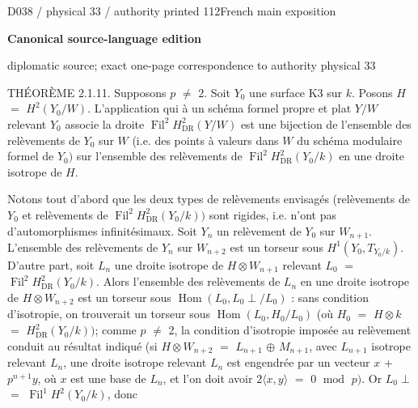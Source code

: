 \documentclass[9pt]{article}
\newcommand{\CanonText}[1]{\par{\fontsize{8.0}{9.35}\selectfont\RaggedRight #1\par}\vspace{2.2pt}}
\newcommand{\LayerTitle}{Canonical source-language edition}
\begin{document}
\noindent\begin{minipage}[t][\dimexpr\textheight-5pt\relax][t]{\textwidth}
{\sffamily\fontsize{7.3}{8.2}\selectfont\color{Quiet} D038 / physical 33 / authority printed 112\hfill French main exposition}
\par{}\vspace{4.5pt}
{\sffamily\fontsize{10.4}{11.6}\selectfont\bfseries\color{Accent} \LayerTitle}
\par{\sffamily\fontsize{6.7}{7.7}\selectfont\color{Quiet} diplomatic source; exact one-page correspondence to authority physical 33}
\vspace{5pt}
\CanonText{THÉORÈME 2.1.11. Supposons \(p\) \(\neq{}\) 2. Soit \(Y_{0}\) une surface K3 sur \(k\). Posons \(H\) \(=\) \(H^{2}(Y_{0}/W)\). L'application qui à un schéma formel propre et plat \(Y/W\) relevant \(Y_{0}\) associe la droite \(\operatorname{Fil}^{2}H^{2}_{\mathrm{DR}}(Y/W)\) est une bijection de l'ensemble des relèvements de \(Y_{0}\) sur \(W\) (i.e. des points à valeurs dans \(W\) du schéma modulaire formel de \(Y_{0})\) sur l'ensemble des relèvements de \(\operatorname{Fil}^{2}H^{2}_{\mathrm{DR}}(Y_{0}/k)\) en une droite isotrope de \(H\).}
\CanonText{Notons tout d'abord que les deux types de relèvements envisagés (relèvements de \(Y_{0}\) et relèvements de \(\operatorname{Fil}^{2}H^{2}_{\mathrm{DR}}(Y_{0}/k))\) sont rigides, i.e. n'ont pas d'automorphismes infinitésimaux. Soit \(Y_{n}\) un relèvement de \(Y_{0}\) sur \(W_{n+1}\). L'ensemble des relèvements de \(Y_{n}\) sur \(W_{n+2}\) est un torseur sous \(H^{1}(Y_{0},T_{Y_{0}/k})\). D'autre part, soit \(L_{n}\) une droite isotrope de \(H\otimes{}W_{n+1}\) relevant \(L_{0}\) \(=\) \(\operatorname{Fil}^{2}H^{2}_{\mathrm{DR}}(Y_{0}/k)\). Alors l'ensemble des relèvements de \(L_{n}\) en une droite isotrope de \(H\otimes{}W_{n+2}\) est un torseur sous \(\operatorname{Hom}(L_{0},L_{0}\perp{}/L_{0})\) : sans condition d'isotropie, on trouverait un torseur sous \(\operatorname{Hom}(L_{0},H_{0}/L_{0})\) (où \(H_{0}\) \(=\) \(H\otimes{}k\) \(=\) \(H^{2}_{\mathrm{DR}}(Y_{0}/k))\); comme \(p\) \(\neq{}\) 2, la condition d'isotropie imposée au relèvement conduit au résultat indiqué (si \(H\otimes{}W_{n+2}\) \(=\) \(L_{n+1}\) \(\oplus{}\) \(M_{n+1}\), avec \(L_{n+1}\) isotrope relevant \(L_{n}\), une droite isotrope relevant \(L_{n}\) est engendrée par un vecteur \(x\) + \(p^{n+1}y\), où \(x\) est une base de \(L_{n}\), et l'on doit avoir \(2\langle{}x,y\rangle{}\) \(=\) 0 \(\operatorname{mod}\) \(p)\). Or \(L_{0}\perp{}\) \(=\) \(\operatorname{Fil}^{1}H^{2}(Y_{0}/k)\), donc}

\end{minipage}
\end{document}

